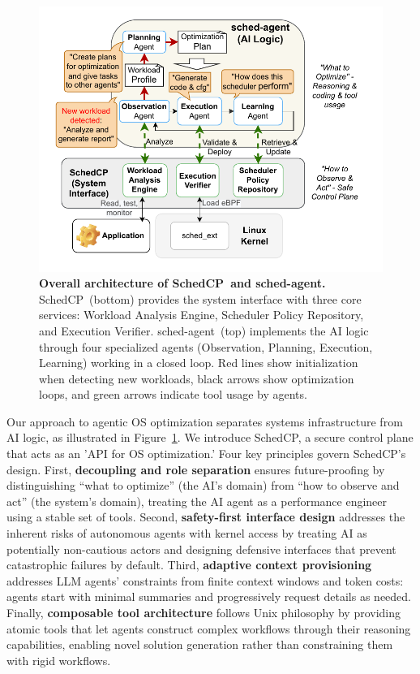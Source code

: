 \documentclass[preprint]{article}
\newcommand{\sys}{SchedCP\xspace}
\newcommand{\agent}{sched-agent\xspace}
\begin{document}
\begin{figure}
    \centering
    \includegraphics[width=\columnwidth]{sections/img/arch-scheddcp.pdf}
    \caption{
        \textbf{Overall architecture of \sys\ and \agent.} 
        \sys\ (bottom) provides the system interface with three core services: Workload Analysis Engine, Scheduler Policy Repository, and Execution Verifier.
        \agent\ (top) implements the AI logic through four specialized agents (Observation, Planning, Execution, Learning) working in a closed loop. Red lines show initialization when detecting new workloads, black arrows show optimization loops, and green arrows indicate tool usage by agents.
    }
    \label{fig:frameworkarch}
\end{figure}

Our approach to agentic OS optimization separates systems infrastructure from AI logic, as illustrated in Figure~\ref{fig:frameworkarch}. We introduce \sys, a secure control plane that acts as an 'API for OS optimization.' Four key principles govern \sys's design. First, \textbf{decoupling and role separation} ensures future-proofing by distinguishing ``what to optimize'' (the AI's domain) from ``how to observe and act'' (the system's domain), treating the AI agent as a performance engineer using a stable set of tools. Second, \textbf{safety-first interface design} addresses the inherent risks of autonomous agents with kernel access by treating AI as potentially non-cautious actors and designing defensive interfaces that prevent catastrophic failures by default. Third, \textbf{adaptive context provisioning} addresses LLM agents' constraints from finite context windows and token costs: agents start with minimal summaries and progressively request details as needed. Finally, \textbf{composable tool architecture} follows Unix philosophy by providing atomic tools that let agents construct complex workflows through their reasoning capabilities, enabling novel solution generation rather than constraining them with rigid workflows.
\end{document}
